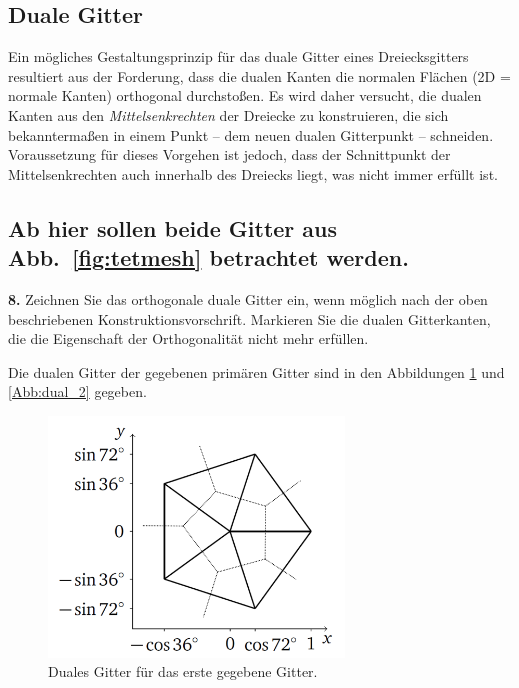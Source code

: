 \documentclass[Protokollheft.tex]{subfiles}
\begin{document}
%
    {\subsection{Duale Gitter}}
    Ein mögliches Gestaltungsprinzip für das duale Gitter eines
    Dreiecksgitters resultiert aus der Forderung, dass die dualen
    Kanten die normalen Flächen (2D = normale Kanten) orthogonal
    durchstoßen. Es wird daher versucht, die dualen Kanten aus den
    \emph{Mittelsenkrechten} der Dreiecke zu konstruieren, die sich
    bekanntermaßen in einem Punkt -- dem neuen dualen Gitterpunkt --
    schneiden. Voraussetzung für dieses Vorgehen ist jedoch, dass
    der Schnittpunkt der Mittelsenkrechten auch innerhalb des Dreiecks
    liegt, was nicht immer erfüllt ist.\\
    \subsection{Ab hier sollen beide Gitter aus Abb.~\ref{fig:tetmesh} betrachtet werden.}

        \begin{framed}
	\noindent \textbf{8.} Zeichnen Sie das orthogonale duale
        Gitter ein, wenn möglich nach der oben beschriebenen
        Konstruktionsvorschrift. Markieren Sie die dualen
        Gitterkanten, die die Eigenschaft der Orthogonalität nicht mehr
        erfüllen.\label{exer:drawDualGrid}
\end{framed}
	Die dualen Gitter der gegebenen primären Gitter sind in den Abbildungen \ref{Abb:dual_1} und \ref{Abb:dual_2} gegeben.
\begin{figure}[h]
	\centering
	\includegraphics[width=0.7\textwidth]{Duales_Gitter_1.png}
	\caption{Duales Gitter für das erste gegebene Gitter.}
	\label{Abb:dual_1}
\end{figure}
\end{document}
